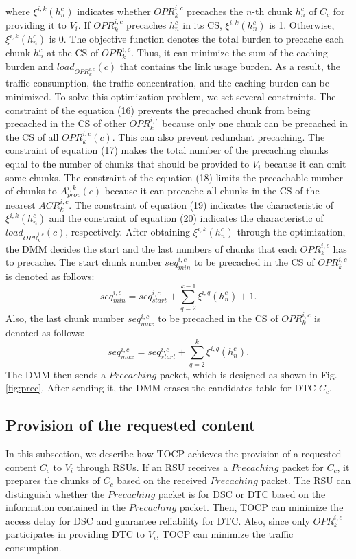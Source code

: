 \documentclass{ieeeaccess}
\begin{document}
where $\xi^{i,k}(h_{n}^{c})$ indicates whether $OPR^{i,c}_{k}$ precaches the $n$-th chunk $h_{n}^{c}$ of $C_{c}$ for providing it to $V_{i}$.
If $OPR^{i,c}_{k}$ precaches  $h_{n}^{c}$ in its CS, $\xi^{i,k}(h_{n}^{c})$ is 1.
Otherwise, $\xi^{i,k}(h_{n}^{c})$ is 0.
The objective function denotes the total burden to precache each chunk $h_{n}^{c}$ at the CS of $OPR^{i,c}_{k}$.
Thus, it can minimize the sum of the caching burden and $load_{OPR^{i,c}_{k}}(c)$ that contains the link usage burden.
As a result, the traffic consumption, the traffic concentration, and the caching burden can be minimized.
To solve this optimization problem, we set several constraints.
The constraint of the equation (16) prevents the precached chunk from being precached in the CS of other $OPR^{i,c}_{k}$ because only one chunk can be precached in the CS of all $OPR^{i,c}_{k}(c)$.
This can also prevent redundant precaching.
The constraint of equation (17) makes the total number of the precaching chunks equal to the number of chunks that should be provided to $V_{i}$ because it can omit some chunks.
The constraint of the equation (18) limits the precachable number of chunks to $A_{prov}^{i, k}(c)$ because it can precache all chunks in the CS of the nearest $ACR^{i,c}_{k}$.
The constraint of equation (19) indicates the characteristic of $\xi^{i,k}(h_{n}^{c})$ and the constraint of equation (20) indicates the characteristic of $load_{OPR^{i,c}_{k}}(c)$, respectively.
After obtaining $\xi^{i,k}(h_{n}^{c})$ through the optimization, the DMM decides the start and the last numbers of chunks that each $OPR^{i,c}_{k}$ has to precache.
The start chunk number $seq_{min}^{i,c}$ to be precached in the CS of $OPR^{i,c}_{k}$ is denoted as follows: 
\begin{equation}
    seq_{min}^{i,c} = seq^{i,c}_{start}+\sum_{q=2}^{k-1} \xi^{i,q}(h_{n}^{c})+1.
\end{equation}
Also, the last chunk number $seq_{max}^{i,c}$ to be precached in the CS of $OPR^{i,c}_{k}$ is denoted as follows:
\begin{equation}
    seq_{max}^{i,c} = seq^{i,c}_{start}+\sum_{q=2}^{k} \xi^{i,q}(h_{n}^{c}).
\end{equation}
The DMM then sends a $Precaching$ packet, which is designed as shown in Fig. \ref{fig:prec}.
After sending it, the DMM erases the candidates table for DTC $C_{c}$.

\subsection{Provision of the requested content} \label{sec.p4}
In this subsection, we describe how TOCP achieves the provision of a requested content $C_{c}$ to $V_{i}$ through RSUs.
If an RSU receives a $Precaching$ packet for $C_{c}$, it prepares the chunks of $C_{c}$ based on the received $Precaching$ packet.
The RSU can distinguish whether the $Precaching$ packet is for DSC or DTC based on the information contained in the $Precaching$ packet.
Then, TOCP can minimize the access delay for DSC and guarantee reliability for DTC.
Also, since only $OPR^{i,c}_{k}$ participates in providing DTC to $V_{i}$, TOCP can minimize the traffic consumption.
\end{document}
